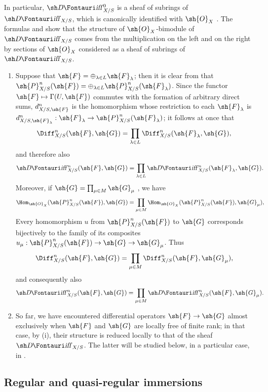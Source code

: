 In particular, $\shDiff_{X/S}^0$ is a sheaf of subrings of $\shDiff_{X/S}$, which is canonically identified with $\sh{O}_X$ .
The formulas  and  show that the structure of $\sh{O}_X$-bimodule of $\shDiff_{X/S}$ comes from the multiplication on the left and on the right by sections of $\sh{O}_X$ considered as a sheaf of subrings of $\shDiff_{X/S}$.

\begin{remarks}[16.8.11]
\label{IV.16.8.11}
\begin{enumerate}
  \item[\rm{(i)}] Suppose that $\sh{F} = \oplus_{\lambda \in L} \sh{F}_\lambda$;
  then it is clear from  that $\sh{P}_{X/S}^n(\sh{F}) = \oplus_{\lambda \in L} \sh{P}_{X/S}^n(\sh{F}_\lambda)$.
  Since the functor $\sh{F} \mapsto \Gamma(U, \sh{F})$ commutes with the formation of arbitrary direct sums, $d_{X/S, \sh{F}}^n$ is the homomorphism whose restriction to each $\sh{F}_\lambda$ is $d_{X/S, \sh{F}_\lambda}^n: \sh{F}_\lambda \to \sh{P}_{X/S}^n(\sh{F}_\lambda)$;
  it follows at once that
  \[
    \Diff_{X/S}^n (\sh{F}, \sh{G}) = \prod_{\lambda \in L} \Diff_{X/S}^n (\sh{F}_\lambda, \sh{G}),
  \]
  and therefore also 
  \[
    \shDiff_{X/S}^n (\sh{F}, \sh{G}) = \prod_{\lambda \in L} \shDiff_{X/S}^n (\sh{F}_\lambda, \sh{G}).
  \]
  Moreover, if $\sh{G} = \prod_{\mu \in M} \sh{G}_\mu$ , we have
  \[
    \Hom_{\sh{O}_X}(\sh{P}_{X/S}^n(\sh{F}), \sh{G}) = \prod_{\mu \in M} \Hom_{\sh{O}_X}(\sh{P}_{X/S}^n(\sh{F}), \sh{G}_\mu),
  \]
  Every homomorphism $u$ from $\sh{P}_{X/S}^n(\sh{F})$ to $\sh{G}$ corresponds bijectively to the family of its composites $u_\mu: \sh{P}_{X/S}^n(\sh{F}) \to \sh{G} \to \sh{G}_\mu$.
  Thus
  \[
    \Diff_{X/S}^n(\sh{F}, \sh{G}) = \prod_{\mu \in M} \Diff_{X/S}^n(\sh{F}, \sh{G}_\mu),
  \]
  and consequently also
  \[
    \shDiff_{X/S}^n(\sh{F}, \sh{G}) = \prod_{\mu \in M} \shDiff_{X/S}^n(\sh{F}, \sh{G}_\mu).
  \]
  \item[\rm{(ii)}]
  So far, we have encountered differential operators $\sh{F} \to \sh{G}$ almost exclusively when $\sh{F}$ and $\sh{G}$ are locally free of finite rank; in that case, by \rm{(i)}, their structure is reduced locally to that of the sheaf $\shDiff_{X/S}$.
  The latter will be studied below, in a particular case, in .
\end{enumerate}
\end{remarks}

\subsection{Regular and quasi-regular immersions}
\label{IV.16.9}

